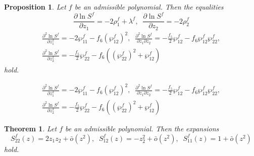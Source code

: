 \documentclass[10pt,a4paper]{amsart}
\newtheorem{theorem}{Theorem}
\newtheorem{proposition}{Proposition}
\begin{document}
	\begin{proposition}\label{propDiffS}
		Let $f$ be an admissible polynomial. Then the equalities
		\begin{equation}\label{eq1DiffS}
			\frac{\partial \ln S^f}{\partial z_1} = -2\rho_1^f + \lambda^f,\;\;\frac{\partial \ln S^f}{\partial z_2} = -2\rho_2^f
		\end{equation}
		\begin{equation}\label{eq2DiffS}
			\begin{gathered}
				\frac{\partial^2 \ln S^f}{\partial z_1^2} = -2\wp^f_{11} - f_6 \left(\wp_{12}^f\right)^2,\;\;\frac{\partial^2 \ln S^f}{\partial z_1 \partial z_2} = - \frac{f_5}{2}\wp_{12}^f - f_6\wp_{12}^f\wp_{22}^f,\\ \frac{\partial^2 \ln S^f}{\partial z_2^2} = - \frac{f_5}{2}\wp_{22}^f - f_6\left(\left(\wp_{22}^f\right)^2 + \wp_{12}^f\right)
			\end{gathered}
		\end{equation}
		hold.
	\end{proposition}

		\begin{equation}
			\begin{gathered}
				\frac{\partial^2 \ln S^f}{\partial z_1^2} = -2\wp^f_{11} - f_6 \left(\wp_{12}^f\right)^2,\;\;\frac{\partial^2 \ln S^f}{\partial z_1 \partial z_2} = - \frac{f_5}{2}\wp_{12}^f - f_6\wp_{12}^f\wp_{22}^f,\\ \frac{\partial^2 \ln S^f}{\partial z_2^2} = - \frac{f_5}{2}\wp_{22}^f - f_6\left(\left(\wp_{22}^f\right)^2 + \wp_{12}^f\right)
			\end{gathered}
		\end{equation}

	\begin{theorem}\label{thTaylorExpansions}
		Let $f$ be an admissible polynomial. Then the expansions
		\begin{equation}\label{eqTaylorExpansions}
			S_{22}^f(z) = 2z_1z_2 + \bar{o}(z^2),\;\;
			S_{12}^f(z) = -z_2^2 + \bar{o}(z^2),\;\;
			S_{11}^f(z) = 1 + \bar{o}(z^2)
		\end{equation}
		hold.
	\end{theorem}
\end{document}
